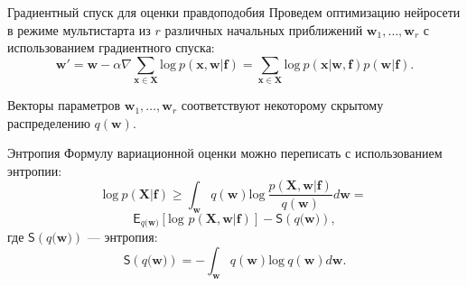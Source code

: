 \documentclass[10pt,pdf,utf8,russian,aspectratio=169]{beamer}
\begin{document}
\begin{frame}{Градиентный спуск для оценки правдоподобия}
Проведем оптимизацию нейросети в режиме мультистарта из $r$ различных начальных приближений $\mathbf{w}_1, \dots, \mathbf{w}_r$ с использованием градиентного спуска:
\[
\mathbf{w}' = \mathbf{w} - \alpha  \nabla \sum_{\mathbf{x} \in \mathbf{X}} \text{log}~p(\mathbf{x},\mathbf{w}|\mathbf{f}) = \sum_{\mathbf{x} \in \mathbf{X}} \text{log}~p(\mathbf{x}|\mathbf{w}, \mathbf{f}) p(\mathbf{w}|\mathbf{f}).
\]

Векторы параметров $\mathbf{w}_1,\dots,\mathbf{w}_r$ соответствуют некоторому скрытому распределению $q(\mathbf{w})$.

\end{frame}

\begin{frame}{Энтропия}
Формулу вариационной оценки можно переписать с использованием энтропии:
$$\text{log}~p(\mathbf{X}|\mathbf{f}) \geq 
\int_{\mathbf{w}} q(\mathbf{w})\text{log}~\frac{p(\mathbf{X},\mathbf{w}|\mathbf{f})}{q(\mathbf{w})}d\mathbf{w} = 
$$
$$
\mathsf{E}_{q(\mathbf{w)}}[\text{log~}p (\mathbf{X}, \mathbf{w}| \mathbf{f})] - \mathsf{S}({q(\mathbf{w)}}),
$$
где $\mathsf{S}({q(\mathbf{w)}})$ --- энтропия:
$$
\mathsf{S}({q(\mathbf{w)}}) = - \int_{\mathbf{w}} q(\mathbf{w})\text{log}~q(\mathbf{w})d\mathbf{w}.  	
$$


\end{frame}
\end{document}
